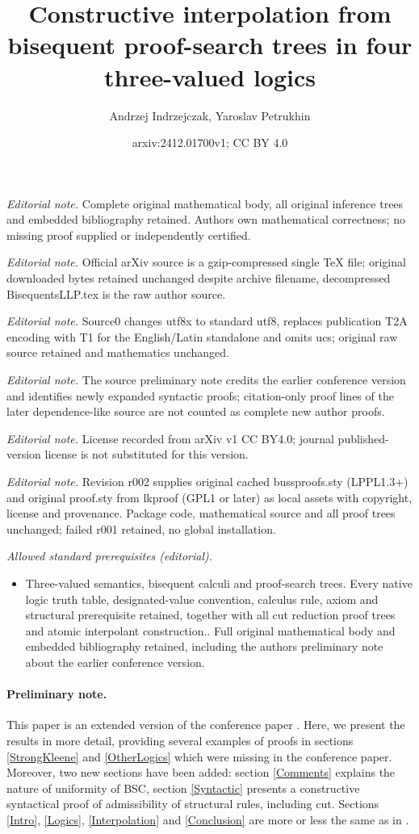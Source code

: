 \documentclass[10pt,a4paper]{article}
\title{Constructive interpolation from bisequent proof-search trees in four three-valued logics}
\author{Andrzej Indrzejczak, Yaroslav Petrukhin}
\date{arxiv:2412.01700v1; CC BY 4.0}
\theoremstyle{definition}
\newcommand{\3}{\vspace{.3in}}
\newcommand{\2}{\vspace{.2in}}
\newcommand{\1}{\vspace{.1in}}
\newcommand{\5}{\vspace{.05in}}
\begin{document}
\maketitle
\noindent\textit{Editorial note.} Complete original mathematical body, all original inference trees and embedded bibliography retained. Authors own mathematical correctness; no missing proof supplied or independently certified.\par\medskip
\noindent\textit{Editorial note.} Official arXiv source is a gzip-compressed single TeX file; original downloaded bytes retained unchanged despite archive filename, decompressed BisequentsLLP.tex is the raw author source.\par\medskip
\noindent\textit{Editorial note.} Source0 changes utf8x to standard utf8, replaces publication T2A encoding with T1 for the English/Latin standalone and omits ucs; original raw source retained and mathematics unchanged.\par\medskip
\noindent\textit{Editorial note.} The source preliminary note credits the earlier conference version and identifies newly expanded syntactic proofs; citation-only proof lines of the later dependence-like source are not counted as complete new author proofs.\par\medskip
\noindent\textit{Editorial note.} License recorded from arXiv v1 CC BY4.0; journal published-version license is not substituted for this version.\par\medskip
\noindent\textit{Editorial note.} Revision r002 supplies original cached bussproofs.sty (LPPL1.3+) and original proof.sty from lkproof (GPL1 or later) as local assets with copyright, license and provenance. Package code, mathematical source and all proof trees unchanged; failed r001 retained, no global installation.\par\medskip
\noindent\textit{Allowed standard prerequisites (editorial).}\begin{itemize}
\item Three-valued semantics, bisequent calculi and proof-search trees. Every native logic truth table, designated-value convention, calculus rule, axiom and structural prerequisite retained, together with all cut reduction proof trees and atomic interpolant construction.. Full original mathematical body and embedded bibliography retained, including the authors preliminary note about the earlier conference version.
\end{itemize}\medskip
\paragraph{Preliminary note.} This paper is an extended version of the conference paper \cite{IndrzejczakPetrukhinCADE}. Here, we present the results in more detail, providing several examples of proofs in sections \ref{StrongKleene} and \ref{OtherLogics} which were missing in the conference paper. Moreover, two new sections have been added: section \ref{Comments} explains the nature of uniformity of BSC, section \ref{Syntactic} presents a constructive syntactical proof of admissibility of structural rules, including cut. Sections \ref{Intro}, \ref{Logics}, \ref{Interpolation} and \ref{Conclusion} are more or less the same as in \cite{IndrzejczakPetrukhinCADE}.
\end{document}
